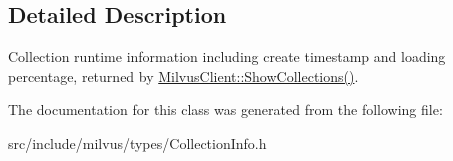 \subsection{Detailed Description}
Collection runtime information including create timestamp and loading percentage, returned by \hyperlink{classmilvus_1_1_milvus_client_a8c5d625d72056a6e4f2f98607ebd0051}{Milvus\+Client\+::\+Show\+Collections()}. 

The documentation for this class was generated from the following file\+:\begin{DoxyCompactItemize}
\item 
src/include/milvus/types/Collection\+Info.\+h\end{DoxyCompactItemize}
